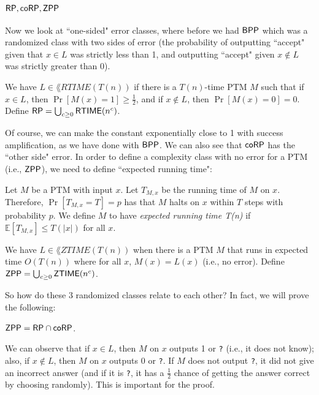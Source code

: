 \subsection{${\mathsf{RP}}, {\mathsf{coRP}}, {\mathsf{ZPP}}$}
Now we look at ``one-sided" error classes, where before we had ${\mathsf{BPP}}$ which was a randomized class with two sides of error (the probability of outputting ``accept" given that $x \in L$ was strictly less than 1, and outputting ``accept" given $x \notin L$ was strictly greater than 0). 

\newcommand{\RTIME}{\lang{RTIME}}
\newcommand{\ZTIME}{\lang{ZTIME}}
\begin{definition}
We have $L \in \RTIME(T(n))$ if there is a $T(n)$-time PTM $M$ such that if $x \in L$, then $\Pr[M(x) = 1] \ge \frac{1}{2}$, and if $x \notin L$, then $\Pr[M(x) = 0] = 0$. Define $\RP = \bigcup_{c \ge 0}\RTIME(n^c)$. 
\end{definition}

Of course, we can make the constant exponentially close to 1 with success amplification, as we have done with ${\mathsf{BPP}}$. We can also see that ${\mathsf{coRP}}$ has the ``other side" error. In order to define a complexity class with no error for a PTM (i.e., ${\mathsf{ZPP}}$), we need to define ``expected running time":

\begin{definition}
Let $M$ be a PTM with input $x$. Let $T_{M,x}$ be the running time of $M$ on $x$. Therefore, $\Pr[T_{M, x} = T] = p$ has that $M$ halts on $x$ within $T$ steps with probability $p$. We define $M$ to have \emph{expected running time T(n)} if $\mathbb{E}[T_{M, x}] \le T(|x|)$ for all $x$. 
\end{definition}

\begin{definition}
We have $L \in \ZTIME(T(n))$ when there is a PTM $M$ that runs in expected time $O(T(n))$ where for all $x$, $M(x) = L(x)$ (i.e., no error). Define $\ZPP = \bigcup_{c \ge 0}\ZTIME(n^c)$. 
\end{definition}

So how do these 3 randomized classes relate to each other? In fact, we will prove the following:
\begin{theorem}
${\mathsf{ZPP}} = {\mathsf{RP}} \cap {\ensuremath{\mathsf{coRP}}}$. 
\end{theorem}

We can observe that if $x \in L$, then $M$ on $x$ outputs 1 or \texttt{?} (i.e., it does not know); also, if $x \notin L$, then $M$ on $x$ outputs 0 or \texttt{?}. If $M$ does not output \texttt{?}, it did not give an incorrect answer (and if it is \texttt{?}, it has a $\frac{1}{2}$ chance of getting the answer correct by choosing randomly). This is important for the proof. 

